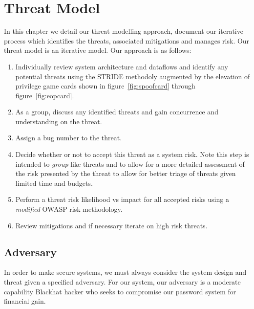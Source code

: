 \chapter{Threat Model}
\label{ch:threatmodel}
In this chapter we detail our threat modelling approach, document our iterative process which identifies the threats, associated mitigations and manages risk.  Our threat model is an iterative model.  Our approach is as follows:
\begin{enumerate}
    \item{Individually review system architecture and dataflows and identify any potential threats using the STRIDE methodoly augmented by the elevation of privilege game cards shown in figure~\ref{fig:spoofcard} through figure~\ref{fig:eopcard}.}
    \item{As a group, discuss any identified threats and gain concurrence and understanding on the threat.}
    \item{Assign a bug number to the threat.}
    \item{Decide whether or not to accept this threat as a system risk.  Note this step is intended to \emph{group} like threats and to allow for a more detailed assessment of the risk presented by the threat to allow for better triage of threats given limited time and budgets.}
    \item{Perform a threat risk likelihood vs impact for all accepted risks using a \emph{modified} OWASP risk methodology.}
    \item{Review mitigations and if necessary iterate on high risk threats.}
\end{enumerate}


\section{Adversary}
\label{sec:adversary}
In order to make secure systems, we must always consider the system design and threat given a specified adversary.  For our system, our adversary is a moderate capability Blackhat hacker who seeks to compromise our password system for financial gain.  

